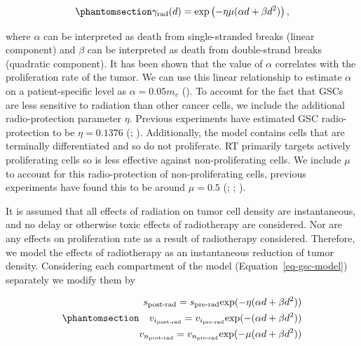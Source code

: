 \documentclass[
  letterpaper,
]{scrreprt}
\theoremstyle{definition}
\theoremstyle{remark}
\begin{document}
\begin{equation}\phantomsection\label{eq-LQ-model}{
    \gamma_{\text{rad}}(d) = \text{exp}\left(-\eta \mu (\alpha d + \beta d^2)\right),
}\end{equation}

where \(\alpha\) can be interpreted as death from single-stranded breaks
(linear component) and \(\beta\) can be interpreted as death from
double-strand breaks (quadratic component). It has been shown that the
value of \(\alpha\) correlates with the proliferation rate of the tumor.
We can use this linear relationship to estimate \(\alpha\) on a
patient-specific level as \(\alpha = 0.05m_v\)
(). To account for the
fact that GSCs are less sensitive to radiation than other cancer cells,
we include the additional radio-protection parameter \(\eta\). Previous
experiments have estimated GSC radio-protection to be \(\eta = 0.1376\)
(; ). Additionally, the model contains cells that are terminally
differentiated and so do not proliferate. RT primarily targets actively
proliferating cells so is less effective against non-proliferating
cells. We include \(\mu\) to account for this radio-protection of
non-proliferating cells, previous experiments have found this to be
around \(\mu = 0.5\) (;
;
).

It is assumed that all effects of radiation on tumor cell density are
instantaneous, and no delay or otherwise toxic effects of radiotherapy
are considered. Nor are any effects on proliferation rate as a result of
radiotherapy considered. Therefore, we model the effects of radiotherapy
as an instantaneous reduction of tumor density. Considering each
compartment of the model (Equation~\ref{eq-gsc-model}) separately we
modify them by

\begin{equation}\phantomsection\label{eq-radiation_model}{ 
  \begin{aligned}
    s_\text{post-rad} = s_\text{pre-rad} \text{exp}(-\eta(\alpha d + \beta d^2)) \\ 
    v_{i_\text{post-rad}} = v_{i_\text{pre-rad}} \text{exp}(-(\alpha d + \beta d^2)) \\ 
    v_{n_\text{post-rad}} = v_{n_\text{pre-rad}} \text{exp}(-\mu(\alpha d + \beta d^2))
  \end{aligned} 
}\end{equation}
\end{document}
